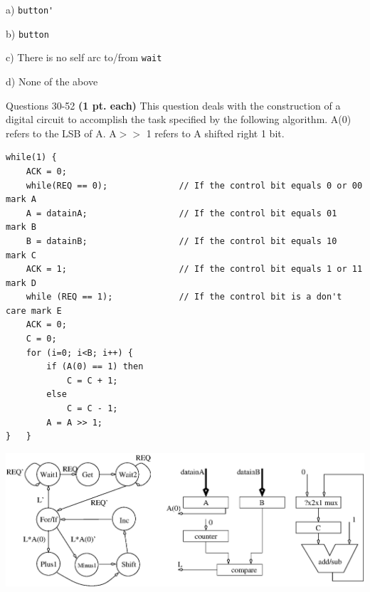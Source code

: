 \documentclass{article}
\begin{document}
\begin{enumerate}
\begin{description}
\item{a) } \verb+button'+
\item{b) } \verb+button+
\item{c) } There is no self arc to/from \verb+wait+
\item{d) } None of the above
\end{description}


\pagebreak
Questions 30-52 {\bf (1 pt. each)} This question deals with the construction 
of a digital circuit to accomplish the task specified by the following 
algorithm.  A(0) refers to the LSB of A.  A$>>$ 1 refers to A shifted right 
1 bit.

{\small
\begin{verbatim}
while(1) {
    ACK = 0;
    while(REQ == 0);              // If the control bit equals 0 or 00  mark A 
    A = datainA;                  // If the control bit equals 01       mark B 
    B = datainB;                  // If the control bit equals 10       mark C 
    ACK = 1;                      // If the control bit equals 1 or 11  mark D 
    while (REQ == 1);             // If the control bit is a don't care mark E 
    ACK = 0;
    C = 0;
    for (i=0; i<B; i++) {
        if (A(0) == 1) then
            C = C + 1;
        else 
            C = C - 1;
        A = A >> 1;
}   } 
\end{verbatim}}

\scalebox{0.7} {\includegraphics{./Fig3/dp&cu2.eps}}


\end{enumerate}
\end{document}
